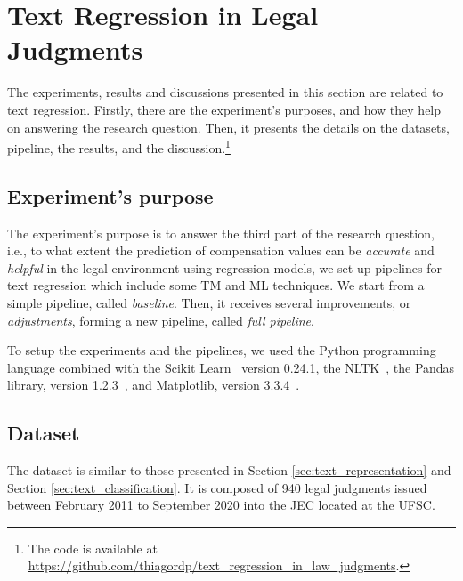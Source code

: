 \section{Text Regression in Legal Judgments}\label{sec:text_regression}

The experiments, results and discussions presented in this section are related to text regression. Firstly, there are the experiment's purposes, and how they help on answering the research question. Then, it presents the details on the datasets, pipeline, the results, and the discussion.\footnote{The code is available at \url{https://github.com/thiagordp/text_regression_in_law_judgments}.}


\subsection{Experiment's purpose}


The experiment's purpose is to answer the third part of the research question, i.e., to what extent the prediction of compensation values can be \emph{accurate} and \emph{helpful} in the legal environment using regression models, we set up pipelines for text regression which include some TM and ML techniques. We start from a simple pipeline, called \emph{baseline}. Then, it receives several improvements, or \emph{adjustments}, forming a new pipeline, called \emph{full pipeline}.


To setup the experiments and the pipelines, we used the Python programming language combined with the Scikit Learn~\cite{Pedregosa2012} version 0.24.1, the \gls{NLTK}~\cite{Loper02}, the Pandas library, version 1.2.3~\cite{Mckinney2010}, and Matplotlib, version 3.3.4~\cite{Hunter:2007}.

\subsection{Dataset}\label{sec:regression_dataset}

The dataset is similar to those presented in Section \ref{sec:text_representation} and Section \ref{sec:text_classification}. It is composed of 940 legal judgments issued between February 2011 to September 2020 into the \gls{JEC} located at the \gls{UFSC}. 



